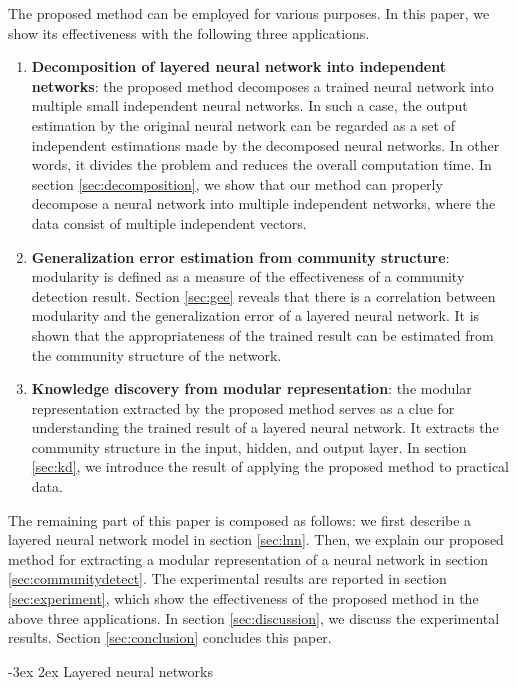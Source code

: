 \documentclass[12pt]{article} %
\makeatletter
\renewcommand\section{\@startsection {section}{1}%
{\z@}%
{-3ex}%
{2ex}%
{\normalfont\normalsize\bfseries}}
\makeatother
\begin{document}
The proposed method can be employed for various purposes. In this paper, we show its effectiveness with the following three applications. 
\begin{enumerate}
\item \textbf{Decomposition of layered neural network into independent networks}: the proposed method decomposes a trained neural network into multiple small independent neural networks. In such a case, the output estimation by the original neural network can be regarded as a set of independent estimations made by the decomposed neural networks. In other words, it divides the problem and reduces the overall computation time. In section \ref{sec:decomposition}, we show that our method can properly decompose a neural network into multiple independent networks, where the data consist of multiple independent vectors. 
\item \textbf{Generalization error estimation from community structure}: modularity \cite{Newman2004} is defined as a measure of the effectiveness of a community detection result. Section \ref{sec:gee} reveals that there is a correlation between modularity and the generalization error of a layered neural network. It is shown that the appropriateness of the trained result can be estimated from the community structure of the network. 
\item \textbf{Knowledge discovery from modular representation}: the modular representation extracted by the proposed method serves as a clue for understanding the trained result of a layered neural network. 
It extracts the community structure in the input, hidden, and output layer. In section \ref{sec:kd}, we introduce the result of applying the proposed method to practical data. 
\end{enumerate}

The remaining part of this paper is composed as follows: we first describe a layered neural network model in section \ref{sec:lnn}. Then, we explain our proposed method for extracting a modular representation of a neural network in section \ref{sec:communitydetect}. The experimental results are reported in section \ref{sec:experiment}, which show the effectiveness of the proposed method in the above three applications. In section \ref{sec:discussion}, we discuss the experimental results. Section \ref{sec:conclusion} concludes this paper. 

\section{Layered neural networks} %
\label{sec:lnn}
\end{document}
